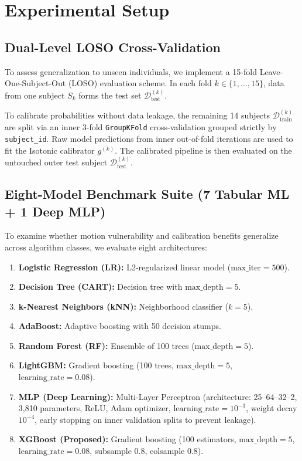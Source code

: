 \documentclass[conference]{IEEEtran}
\begin{document}
\section{Experimental Setup}

\subsection{Dual-Level LOSO Cross-Validation}
To assess generalization to unseen individuals, we implement a 15-fold Leave-One-Subject-Out (LOSO) evaluation scheme. In each fold $k \in \{1, \dots, 15\}$, data from one subject $S_k$ forms the test set $\mathcal{D}_{\text{test}}^{(k)}$. 

To calibrate probabilities without data leakage, the remaining 14 subjects $\mathcal{D}_{\text{train}}^{(k)}$ are split via an inner 3-fold \texttt{GroupKFold} cross-validation grouped strictly by \texttt{subject\_id}. Raw model predictions from inner out-of-fold iterations are used to fit the Isotonic calibrator $g^{(k)}$. The calibrated pipeline is then evaluated on the untouched outer test subject $\mathcal{D}_{\text{test}}^{(k)}$.

\subsection{Eight-Model Benchmark Suite (7 Tabular ML + 1 Deep MLP)}
To examine whether motion vulnerability and calibration benefits generalize across algorithm classes, we evaluate eight architectures:
\begin{enumerate}
    \item \textbf{Logistic Regression (LR):} L2-regularized linear model ($\text{max\_iter}=500$).
    \item \textbf{Decision Tree (CART):} Decision tree with $\text{max\_depth}=5$.
    \item \textbf{k-Nearest Neighbors (kNN):} Neighborhood classifier ($k=5$).
    \item \textbf{AdaBoost:} Adaptive boosting with 50 decision stumps.
    \item \textbf{Random Forest (RF):} Ensemble of 100 trees ($\text{max\_depth}=5$).
    \item \textbf{LightGBM:} Gradient boosting (100 trees, $\text{max\_depth}=5$, $\text{learning\_rate}=0.08$).
    \item \textbf{MLP (Deep Learning):} Multi-Layer Perceptron (architecture: 25--64--32--2, 3,810 parameters, ReLU, Adam optimizer, $\text{learning\_rate}=10^{-3}$, weight decay $10^{-4}$, early stopping on inner validation splits to prevent leakage).
    \item \textbf{XGBoost (Proposed):} Gradient boosting (100 estimators, $\text{max\_depth}=5$, $\text{learning\_rate}=0.08$, subsample $0.8$, colsample $0.8$).
\end{enumerate}
\end{document}
